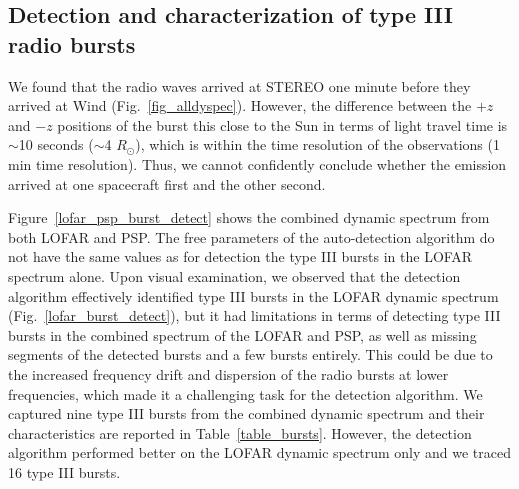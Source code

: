 \subsection{Detection and characterization of type III radio bursts}
We found that the radio waves arrived at STEREO one minute before they arrived at Wind (Fig.~\ref{fig_alldyspec}). However, the difference between the $+z$ and $-z$ positions of the burst this close to the Sun in terms of light travel time is $\sim$10 seconds ($\sim$4 $R_\odot$), which is within the time resolution of the observations (1 min time resolution). Thus, we cannot confidently conclude whether the emission arrived at one spacecraft first and the other second.

Figure~\ref{lofar_psp_burst_detect} shows the combined dynamic spectrum from both LOFAR and PSP. The free parameters of the auto-detection algorithm do not have the same values as for detection the type III bursts in the LOFAR spectrum alone.
Upon visual examination, we observed that the detection algorithm effectively identified type III bursts in the LOFAR dynamic spectrum (Fig.~\ref{lofar_burst_detect}), but it had limitations in terms of detecting type III bursts in the combined spectrum of the LOFAR and PSP, as well as missing segments of the detected bursts and a few bursts entirely.
This could be due to the increased frequency drift and dispersion of the radio bursts at lower frequencies, which made it a challenging task for the detection algorithm.
We captured nine type III bursts from the combined dynamic spectrum and their characteristics are reported in Table~\ref{table_bursts}.
However, the detection algorithm performed better on the LOFAR dynamic spectrum only and we traced 16 type III bursts.

